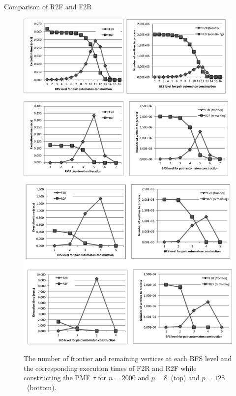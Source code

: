 \documentclass{beamer}
\begin{document}
\begin{frame}{Comparison of R2F and F2R}
\begin{figure}[H]
{		\includegraphics[height=0.5\textheight]{figs/8t_gray.pdf}
	}
	\caption{The number of frontier and remaining vertices at each BFS level and the corresponding execution times of F2R and R2F while constructing the PMF $\tau$ for $n = 2000$ and $p = 8$~(top) and $p=128$~(bottom).}
	
	\label{fig:BFS-vtcomparison}
\end{figure}
\end{frame}
\end{document}
